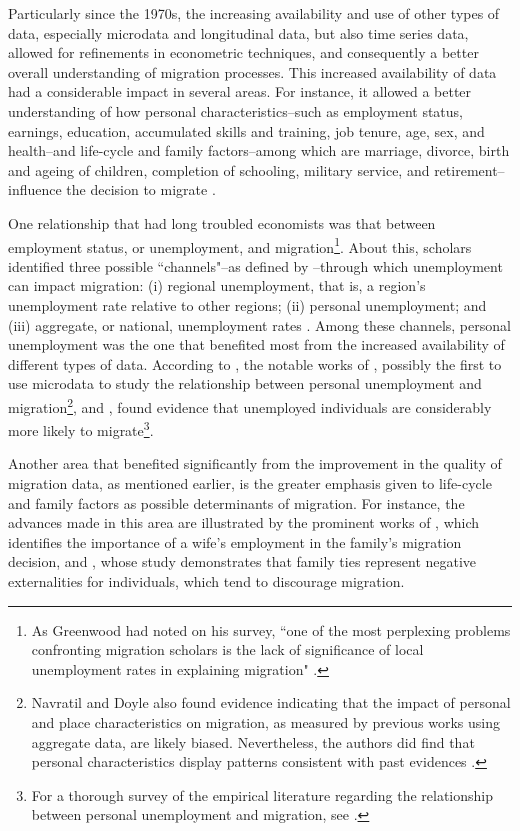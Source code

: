 Particularly since the 1970s, the increasing availability and use of other types of data, especially microdata and longitudinal data, but also time series data, allowed for refinements in econometric techniques, and consequently a better overall understanding of migration processes. This increased availability of data had a considerable impact in several areas. For instance, it allowed a better understanding of how personal characteristics--such as employment status, earnings, education, accumulated skills and training, job tenure, age, sex, and health--and life-cycle and family factors--among which are marriage, divorce, birth and ageing of children, completion of schooling, military service, and retirement--influence the decision to migrate \citep{greenwood_human_1985, greenwood_internal_1997}. 

One relationship that had long troubled economists was that between employment status, or unemployment, and migration\footnote{As Greenwood had noted on his survey, ``one of the most perplexing problems confronting migration scholars is the lack of significance of local unemployment rates in explaining migration" \citep[p. 411]{greenwood_research_1975}.}. About this, scholars identified three possible ``channels"--as defined by \cite{greenwood_internal_1997}--through which unemployment can impact migration: (i) regional unemployment, that is, a region's unemployment rate relative to other regions; (ii) personal unemployment; and (iii) aggregate, or national, unemployment rates \citep{greenwood_internal_1997}. Among these channels, personal unemployment was the one that benefited most from the increased availability of different types of data. According to \cite{herzog_migration_1993}, the notable works of \cite{navratil_socioeconomic_1977}, possibly the first to use microdata to study the relationship between personal unemployment and migration\footnote{Navratil and Doyle also found evidence indicating that the impact of personal and place characteristics on migration, as measured by previous works using aggregate data, are likely biased. Nevertheless, the authors did find that personal characteristics display patterns consistent with past evidences \citep{navratil_socioeconomic_1977}.}, and \cite{davanzo_does_1978}, found evidence that unemployed individuals are considerably more likely to migrate\footnote{For a thorough survey of the empirical literature regarding the relationship between personal unemployment and migration, see \cite{herzog_migration_1993}.}.

Another area that benefited significantly from the improvement in the quality of migration data, as mentioned earlier, is the greater emphasis given to life-cycle and family factors as possible determinants of migration. For instance, the advances made in this area are illustrated by the prominent works of \cite{sandell_women_1977}, which identifies the importance of a wife's employment in the family's migration decision, and \cite{mincer_family_1978}, whose study demonstrates that family ties represent negative externalities for individuals, which tend to discourage migration. 

